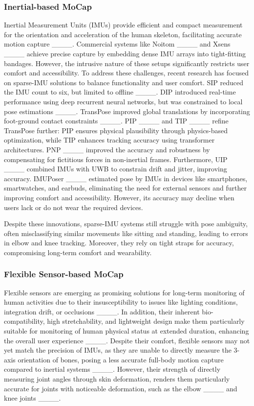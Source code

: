 \subsubsection{Inertial-based MoCap} 
Inertial Measurement Units (IMUs) provide efficient and compact measurement for the orientation and acceleration of the human skeleton, facilitating accurate motion capture ____. Commercial systems like Noitom ____ and Xsens ____ achieve precise capture by embedding dense IMU arrays into tight-fitting bandages. However, the intrusive nature of these setups significantly restricts user comfort and accessibility. To address these challenges, recent research has focused on sparse-IMU solutions to balance functionality and user comfort. SIP reduced the IMU count to six, but limited to offline ____. DIP introduced real-time performance using deep recurrent neural networks, but was constrained to local pose estimations ____. TransPose improved global translations by incorporating foot-ground contact constraints ____. PIP ____ and TIP ____ refine TransPose further: PIP ensures physical plausibility through physics-based optimization, while TIP enhances tracking accuracy using transformer architectures. PNP ____ improved the accuracy and robustness by compensating for fictitious forces in non-inertial frames. Furthermore, UIP ____ combined IMUs with UWB to constrain drift and jitter, improving accuracy. IMUPoser ____ estimated pose by IMUs in devices like smartphones, smartwatches, and earbuds, eliminating the need for external sensors and further improving comfort and accessibility. However, its accuracy may decline when users lack or do not wear the required devices.

Despite these innovations, sparse-IMU systems still struggle with pose ambiguity, often misclassifying similar movements like sitting and standing, leading to errors in elbow and knee tracking. Moreover, they rely on tight straps for accuracy, compromising long-term comfort and wearability.

\subsubsection{Flexible Sensor-based MoCap}
Flexible sensors are emerging as promising solutions for long-term monitoring of human activities due to their insusceptibility to issues like lighting conditions, integration drift, or occlusions ____. In addition, their inherent bio-compatibility, high stretchability, and lightweight design make them particularly suitable for monitoring of human physical status at extended duration, enhancing the overall user experience ____. Despite their comfort, flexible sensors may not yet match the precision of IMUs, as they are unable to directly measure the 3-axis orientation of bones, posing a less accurate full-body motion capture compared to inertial systems ____. However, their strength of directly measuring joint angles through skin deformation, renders them particularly accurate for joints with noticeable deformation, such as the elbow ____ and knee joints ____.

